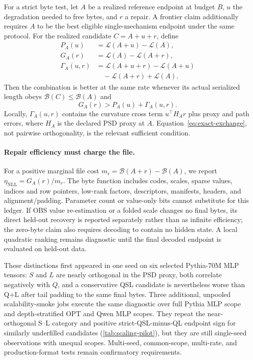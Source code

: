 For a strict byte test, let $A$ be a realized reference endpoint at budget
$B$, $u$ the degradation needed to free bytes, and $r$ a repair.  A frontier
claim additionally requires $A$ to be the best eligible single-mechanism
endpoint under the same protocol.
For the realized candidate $C=A+u+r$, define
\begin{align}
P_A(u)&=\mathcal{L}(A+u)-\mathcal{L}(A),\nonumber\\
G_A(r)&=\mathcal{L}(A)-\mathcal{L}(A+r),\nonumber\\
\Gamma_A(u,r)&=\mathcal{L}(A+u+r)-\mathcal{L}(A+u)\nonumber\\
&\quad-\mathcal{L}(A+r)+\mathcal{L}(A).
\end{align}
Then the combination is better at the same rate whenever its actual
serialized length obeys $\mathcal{B}(C)\le\mathcal{B}(A)$ and
\begin{equation}
\label{eq:exact-exchange}
G_A(r)>P_A(u)+\Gamma_A(u,r).
\end{equation}
Locally, $\Gamma_A(u,r)$ contains the curvature cross term
$u^\top H_A r$ plus proxy and path errors, where $H_A$ is the declared
PSD proxy at $A$.  Equation~\eqref{eq:exact-exchange}, not pairwise
orthogonality, is the relevant sufficient condition.

\paragraph{Repair efficiency must charge the file.}
For a positive marginal file cost
$m_r=\mathcal{B}(A+r)-\mathcal{B}(A)$, we report
$\eta_{\mathrm{NLL}}=G_A(r)/m_r$.  The byte function includes codes,
scales, sparse values, indices and row pointers, low-rank factors,
descriptors, manifests, headers, and alignment/padding.  Parameter count or
value-only bits cannot substitute for this ledger.  If OBS value
re-estimation or a folded scale changes no final bytes, its direct
held-out recovery is reported separately rather than as infinite
efficiency; the zero-byte claim also requires decoding to contain no
hidden state.  A local quadratic ranking remains diagnostic until the
final decoded endpoint is evaluated on held-out data.

These distinctions first appeared in one seed on six selected Pythia-70M
MLP tensors: $S$ and $L$ are nearly orthogonal in the PSD proxy, both
correlate negatively with $Q$, and a conservative QSL candidate is
nevertheless worse than Q+L after tail padding to the same final bytes.  Three
additional, unpooled scalability-smoke jobs execute
the same diagnostic over full Pythia MLP scope and depth-stratified OPT and
Qwen MLP scopes.  They repeat the near-orthogonal S--L category and positive
strict-QSL-minus-QL endpoint sign for similarly underfilled candidates
(\cref{tab:scaling-pilot}), but they are
still single-seed observations with unequal scopes.  Multi-seed, common-scope,
multi-rate, and production-format tests remain confirmatory requirements.
